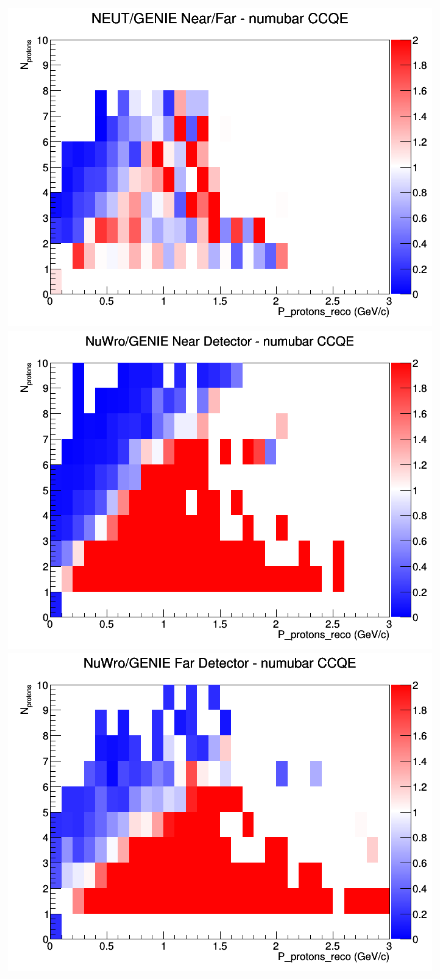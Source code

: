 \documentclass[12pt]{article}
\begin{document}
\begin{figure}[h]
\endminipage
{}
\includegraphics[width=\linewidth]{eff_N_P/GAr/protons/ratios/CCQE_NEUT_GENIE_numubar_NF_N_P.png}
\endminipage
\newline
{}
\includegraphics[width=\linewidth]{eff_N_P/GAr/protons/ratios/CCQE_NuWro_GENIE_numubar_near_N_P.png}
\endminipage
{}
\includegraphics[width=\linewidth]{eff_N_P/GAr/protons/ratios/CCQE_NuWro_GENIE_numubar_far_N_P.png}

\end{figure}
\end{document}
